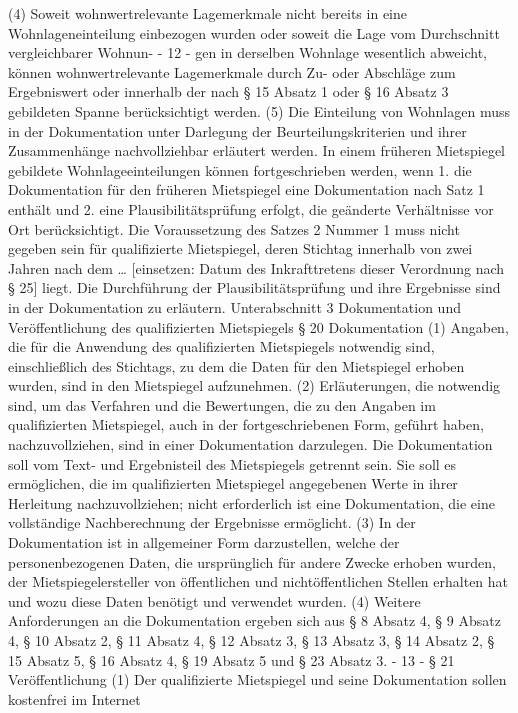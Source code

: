 (4) Soweit wohnwertrelevante Lagemerkmale nicht bereits in eine Wohnlageneinteilung einbezogen wurden oder soweit die Lage vom Durchschnitt vergleichbarer Wohnun-
- 12 -
gen in derselben Wohnlage wesentlich abweicht, können wohnwertrelevante Lagemerkmale durch Zu- oder Abschläge zum Ergebniswert oder innerhalb der nach § 15 Absatz 1
oder § 16 Absatz 3 gebildeten Spanne berücksichtigt werden.
(5) Die Einteilung von Wohnlagen muss in der Dokumentation unter Darlegung der
Beurteilungskriterien und ihrer Zusammenhänge nachvollziehbar erläutert werden. In einem früheren Mietspiegel gebildete Wohnlageeinteilungen können fortgeschrieben werden,
wenn
1. die Dokumentation für den früheren Mietspiegel eine Dokumentation nach Satz 1 enthält und
2. eine Plausibilitätsprüfung erfolgt, die geänderte Verhältnisse vor Ort berücksichtigt.
Die Voraussetzung des Satzes 2 Nummer 1 muss nicht gegeben sein für qualifizierte Mietspiegel, deren Stichtag innerhalb von zwei Jahren nach dem … [einsetzen: Datum des Inkrafttretens dieser Verordnung nach § 25] liegt. Die Durchführung der Plausibilitätsprüfung
und ihre Ergebnisse sind in der Dokumentation zu erläutern.
Unterabschnitt 3
Dokumentation und Veröffentlichung des qualifizierten Mietspiegels
§ 20
Dokumentation
(1) Angaben, die für die Anwendung des qualifizierten Mietspiegels notwendig sind,
einschließlich des Stichtags, zu dem die Daten für den Mietspiegel erhoben wurden, sind
in den Mietspiegel aufzunehmen.
(2) Erläuterungen, die notwendig sind, um das Verfahren und die Bewertungen, die
zu den Angaben im qualifizierten Mietspiegel, auch in der fortgeschriebenen Form, geführt
haben, nachzuvollziehen, sind in einer Dokumentation darzulegen. Die Dokumentation soll
vom Text- und Ergebnisteil des Mietspiegels getrennt sein. Sie soll es ermöglichen, die im
qualifizierten Mietspiegel angegebenen Werte in ihrer Herleitung nachzuvollziehen; nicht
erforderlich ist eine Dokumentation, die eine vollständige Nachberechnung der Ergebnisse
ermöglicht.
(3) In der Dokumentation ist in allgemeiner Form darzustellen, welche der personenbezogenen Daten, die ursprünglich für andere Zwecke erhoben wurden, der Mietspiegelersteller von öffentlichen und nichtöffentlichen Stellen erhalten hat und wozu diese Daten
benötigt und verwendet wurden.
(4) Weitere Anforderungen an die Dokumentation ergeben sich aus § 8 Absatz 4, § 9
Absatz 4, § 10 Absatz 2, § 11 Absatz 4, § 12 Absatz 3, § 13 Absatz 3, § 14 Absatz 2, § 15
Absatz 5, § 16 Absatz 4, § 19 Absatz 5 und § 23 Absatz 3.
- 13 -
§ 21
Veröffentlichung
(1) Der qualifizierte Mietspiegel und seine Dokumentation sollen kostenfrei im Internet
